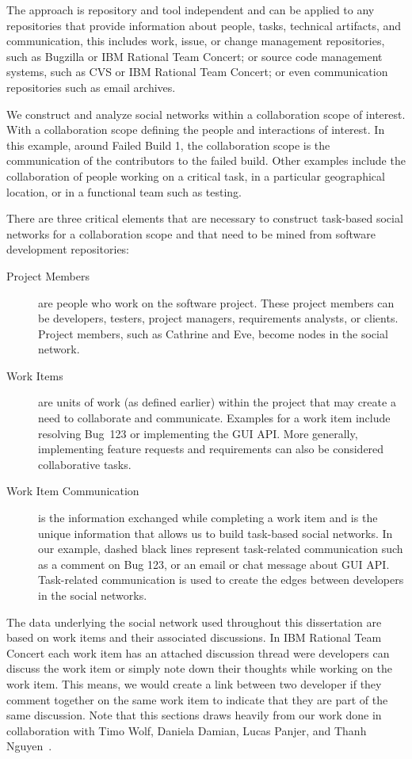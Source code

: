 The approach is repository and tool independent and can be applied to any repositories that provide information about people, tasks, technical artifacts, and communication, this includes work, issue, or change management repositories, such as Bugzilla or IBM Rational Team Concert; or source code management systems, such as CVS or IBM Rational Team Concert; or even communication repositories such as email archives.

We construct and analyze social networks within a collaboration scope of interest.
With a collaboration scope defining the people and interactions of interest.
In this example, around Failed Build 1, the collaboration scope is the communication of the contributors to the failed build. 
Other examples include the collaboration of people working on a critical task, in a particular geographical location, or in a functional team such as testing.

There are three critical elements that are necessary to construct task-based social networks for a collaboration scope and that need to be mined from software development repositories:

\begin{description}
\item[Project Members] are people who work on the software project. 
These project members can be developers, testers, project managers, requirements analysts,
or clients. 
Project members, such as Cathrine and Eve, become nodes in the social network.

\item[Work Items] are units of work (as defined earlier) within the project that may create a need to collaborate and communicate. 
Examples for a work item include resolving Bug~123 or implementing the GUI API. 
More generally, implementing feature requests and requirements can also be considered collaborative tasks.

\item[Work Item Communication] is the information exchanged while completing a work item and is the unique information that allows us to build task-based social networks. 
In our example, dashed black lines represent task-related communication such as a comment on Bug 123, or an email or chat message about GUI API.
Task-related communication is used to create the edges between developers in the social networks.
\end{description}

The data underlying the social network used throughout this dissertation are based on work items and their associated discussions.
In IBM Rational Team Concert each work item has an attached discussion thread were developers can discuss the work item or simply note down their thoughts while working on the work item.
This means, we would create a link between two developer if they comment together on the same work item to indicate that they are part of the same discussion.
Note that this sections draws heavily from our work done in collaboration with Timo Wolf, Daniela Damian, Lucas Panjer, and Thanh Nguyen~\cite{wolf:ieee:2009}.

